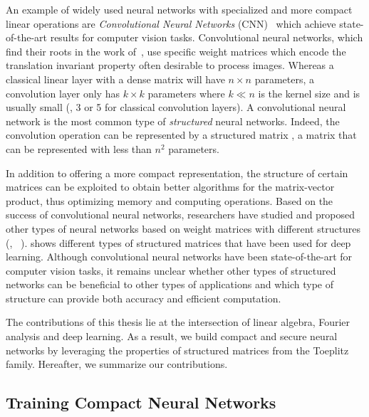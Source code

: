 An example of widely used neural networks with specialized and more compact linear operations are \emph{Convolutional Neural Networks} (CNN)~\cite{lecun1998gradient,krizhevsky2012imagenet,he2016deep,tan2019efficientnet} which achieve state-of-the-art results for computer vision tasks.
Convolutional neural networks, which find their roots in the work of~\citet{fukushima1982neocognitron}, use specific weight matrices which encode the translation invariant property often desirable to process images.
Whereas a classical linear layer with a dense matrix will have $n \times n$ parameters, a convolution layer only has $k \times k$ parameters where $k \ll n$ is the kernel size and is usually small (\eg, 3 or 5 for classical convolution layers).
A convolutional neural network is the most common type of \emph{structured} neural networks.
Indeed, the convolution operation can be represented by a structured matrix \ie, a matrix that can be represented with less than $n^2$ parameters.


In addition to offering a more compact representation, the structure of certain matrices can be exploited to obtain better algorithms for the matrix-vector product, thus optimizing memory and computing operations.
Based on the success of convolutional neural networks, researchers have studied and proposed other types of neural networks based on weight matrices with different structures (\eg, ~\citet{moczulski2016acdc,sindhwani2015structured}).
 shows different types of structured matrices that have been used for deep learning.
Although convolutional neural networks have been state-of-the-art for computer vision tasks, it remains unclear whether other types of structured networks can be beneficial to other types of applications and which type of structure can provide both accuracy and efficient computation.

The contributions of this thesis lie at the intersection of linear algebra, Fourier analysis and deep learning.
As a result, we build compact and secure neural networks by leveraging the properties of structured matrices from the Toeplitz family.
Hereafter, we summarize our contributions.

\subsection{Training Compact Neural Networks}
\label{subsection:ch1-training_compact_neural_networks}


